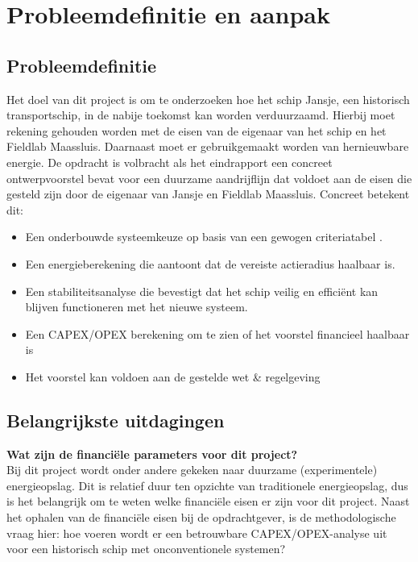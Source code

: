 \chapter{Probleemdefinitie en aanpak}

\section{Probleemdefinitie}
Het doel van dit project is om te onderzoeken hoe het schip Jansje, een historisch transportschip, in de nabije toekomst kan worden verduurzaamd. Hierbij moet rekening gehouden worden met de eisen van de eigenaar van het schip en het Fieldlab Maassluis. Daarnaast moet er gebruikgemaakt worden van hernieuwbare energie. De opdracht is volbracht als het eindrapport een concreet ontwerpvoorstel bevat voor een duurzame aandrijflijn dat voldoet aan de eisen die gesteld zijn door de eigenaar van Jansje en Fieldlab Maassluis. Concreet betekent dit: 
\begin{itemize}
    \item Een onderbouwde systeemkeuze op basis van een gewogen criteriatabel \cite{Triantaphyllou2000}.
    \item Een energieberekening die aantoont dat de vereiste actieradius haalbaar is.
    \item Een stabiliteitsanalyse die bevestigt dat het schip veilig en efficiënt kan blijven functioneren met het nieuwe systeem.
    \item Een CAPEX/OPEX berekening om te zien of het voorstel financieel haalbaar is
    \item 
    Het voorstel kan voldoen aan de gestelde wet \& regelgeving
\end{itemize}


\section{Belangrijkste uitdagingen}

\textbf{Wat zijn de financiële parameters voor dit project?} \\
    Bij dit project wordt onder andere gekeken naar duurzame (experimentele) energieopslag. Dit is relatief duur ten opzichte van traditionele energieopslag, dus is het belangrijk om te weten welke financiële eisen er zijn voor dit project. Naast het ophalen van de financiële eisen bij de opdrachtgever, is de methodologische vraag hier: hoe voeren wordt er een betrouwbare CAPEX/OPEX-analyse uit voor een historisch schip met  onconventionele systemen?\\
    
